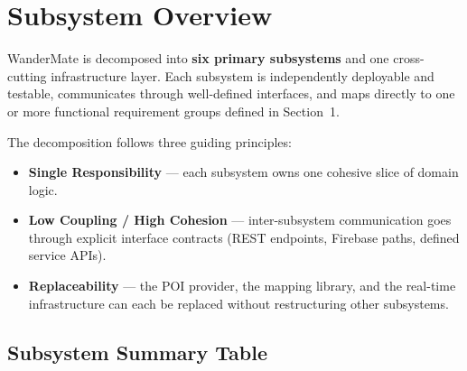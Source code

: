 \documentclass[12pt, a4paper]{article}
\begin{document}
\section{Subsystem Overview}

WanderMate is decomposed into \textbf{six primary subsystems} and one cross-cutting infrastructure layer. Each subsystem is independently deployable and testable, communicates through well-defined interfaces, and maps directly to one or more functional requirement groups defined in Section~1.

The decomposition follows three guiding principles:
\begin{itemize}
  \item \textbf{Single Responsibility} --- each subsystem owns one cohesive slice of domain logic.
  \item \textbf{Low Coupling / High Cohesion} --- inter-subsystem communication goes through explicit interface contracts (REST endpoints, Firebase paths, defined service APIs).
  \item \textbf{Replaceability} --- the POI provider, the mapping library, and the real-time infrastructure can each be replaced without restructuring other subsystems.
\end{itemize}

\subsection{Subsystem Summary Table}
\end{document}

